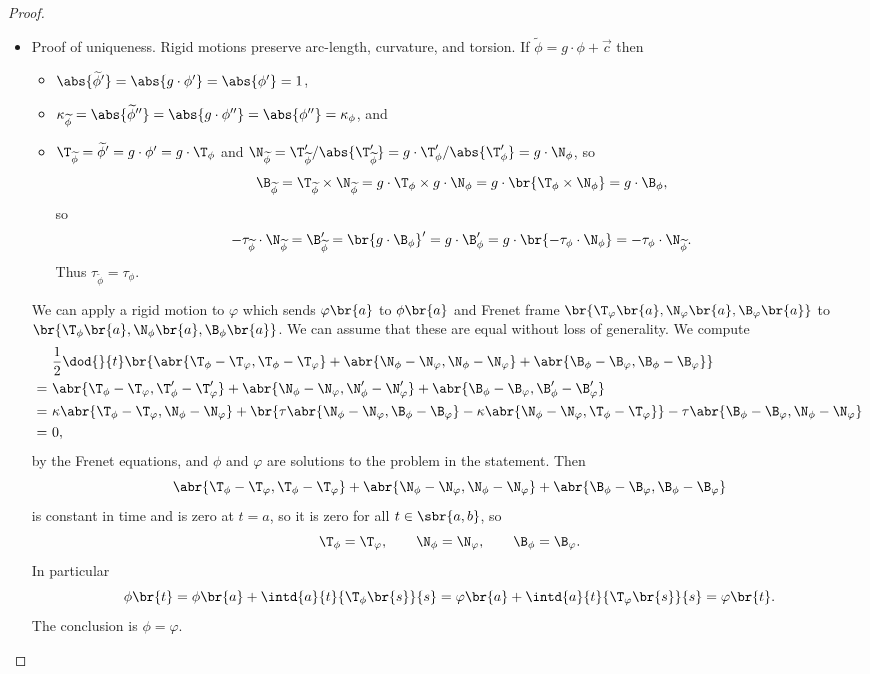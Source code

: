 \begin{proof}
\hfill
\begin{itemize}
\item Proof of uniqueness. Rigid motions preserve arc-length, curvature, and torsion. If $ \widetilde{\phi} = g \cdot \phi + \vec{c} $ then
\begin{itemize}
\item $ \abs{\widetilde{\phi}'} = \abs{g \cdot \phi'} = \abs{\phi'} = 1 $,
\item $ \kappa_{\widetilde{\phi}} = \abs{\widetilde{\phi}''} = \abs{g \cdot \phi''} = \abs{\phi''} = \kappa_\phi $, and
\item $ \T_{\widetilde{\phi}} = \widetilde{\phi}' = g \cdot \phi' = g \cdot \T_\phi $ and $ \N_{\widetilde{\phi}} = \T_{\widetilde{\phi}}' / \abs{\T_{\widetilde{\phi}}'} = g \cdot \T_\phi' / \abs{\T_\phi'} = g \cdot \N_\phi $, so
$$ \B_{\widetilde{\phi}} = \T_{\widetilde{\phi}} \times \N_{\widetilde{\phi}} = g \cdot \T_\phi \times g \cdot \N_\phi = g \cdot \br{\T_\phi \times \N_\phi} = g \cdot \B_\phi, $$
so
$$ -\tau_{\widetilde{\phi}} \cdot \N_{\widetilde{\phi}} = \B_{\widetilde{\phi}}' = \br{g \cdot \B_\phi}' = g \cdot \B_\phi' = g \cdot \br{-\tau_\phi \cdot \N_\phi} = -\tau_\phi \cdot \N_{\widetilde{\phi}}. $$
Thus $ \tau_{\widetilde{\phi}} = \tau_\phi $.
\end{itemize}
We can apply a rigid motion to $ \varphi $ which sends $ \varphi\br{a} $ to $ \phi\br{a} $ and Frenet frame $ \br{\T_\varphi\br{a}, \N_\varphi\br{a}, \B_\varphi\br{a}} $ to $ \br{\T_\phi\br{a}, \N_\phi\br{a}, \B_\phi\br{a}} $. We can assume that these are equal without loss of generality. We compute
\begin{align*}
& \dfrac{1}{2}\dod{}{t}\br{\abr{\T_\phi - \T_\varphi, \T_\phi - \T_\varphi} + \abr{\N_\phi - \N_\varphi, \N_\phi - \N_\varphi} + \abr{\B_\phi - \B_\varphi, \B_\phi - \B_\varphi}} \\
= \ & \abr{\T_\phi - \T_\varphi, \T_\phi' - \T_\varphi'} + \abr{\N_\phi - \N_\varphi, \N_\phi' - \N_\varphi'} + \abr{\B_\phi - \B_\varphi, \B_\phi' - \B_\varphi'} \\
= \ & \kappa\abr{\T_\phi - \T_\varphi, \N_\phi - \N_\varphi} + \br{\tau\abr{\N_\phi - \N_\varphi, \B_\phi - \B_\varphi} - \kappa\abr{\N_\phi - \N_\varphi, \T_\phi - \T_\varphi}} - \tau\abr{\B_\phi - \B_\varphi, \N_\phi - \N_\varphi} \\
= \ & 0,
\end{align*}
by the Frenet equations, and $ \phi $ and $ \varphi $ are solutions to the problem in the statement. Then
$$ \abr{\T_\phi - \T_\varphi, \T_\phi - \T_\varphi} + \abr{\N_\phi - \N_\varphi, \N_\phi - \N_\varphi} + \abr{\B_\phi - \B_\varphi, \B_\phi - \B_\varphi} $$
is constant in time and is zero at $ t = a $, so it is zero for all $ t \in \sbr{a, b} $, so
$$ \T_\phi = \T_\varphi, \qquad \N_\phi = \N_\varphi, \qquad \B_\phi = \B_\varphi. $$
In particular
$$ \phi\br{t} = \phi\br{a} + \intd{a}{t}{\T_\phi\br{s}}{s} = \varphi\br{a} + \intd{a}{t}{\T_\varphi\br{s}}{s} = \varphi\br{t}. $$
The conclusion is $ \phi = \varphi $.


\end{itemize}
\end{proof}
